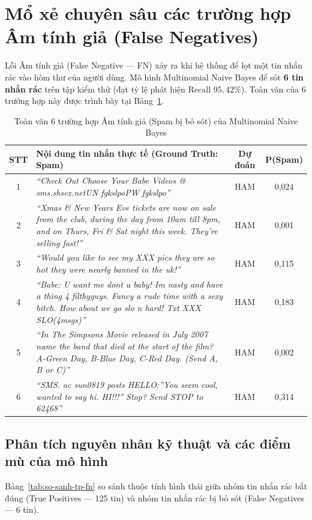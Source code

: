 \section{Mổ xẻ chuyên sâu các trường hợp Âm tính giả (False Negatives)}
\label{sec:false-negatives}

Lỗi Âm tính giả (False Negative --- FN) xảy ra khi hệ thống để lọt một tin nhắn rác vào hòm thư của người dùng. Mô hình Multinomial Naive Bayes để sót \textbf{6 tin nhắn rác} trên tập kiểm thử (đạt tỷ lệ phát hiện Recall $95,42\%$). Toàn văn của 6 trường hợp này được trình bày tại Bảng~\ref{tab:danh-sach-fn}.

\begin{table}[H]
\centering
\caption{Toàn văn 6 trường hợp Âm tính giả (Spam bị bỏ sót) của Multinomial Naive Bayes}
\label{tab:danh-sach-fn}
\begin{tabular}{|c|p{9.8cm}|c|c|}
\hline
\textbf{STT} & \textbf{Nội dung tin nhắn thực tế (Ground Truth: Spam)} & \textbf{Dự đoán} & \textbf{P(Spam)} \\
\hline
1 & \textit{“Check Out Choose Your Babe Videos @ sms.shsex.netUN fgkslpoPW fgkslpo”} & HAM & 0,024 \\
\hline
2 & \textit{“Xmas \& New Years Eve tickets are now on sale from the club, during the day from 10am till 8pm, and on Thurs, Fri \& Sat night this week. They're selling fast!”} & HAM & 0,001 \\
\hline
3 & \textit{“Would you like to see my XXX pics they are so hot they were nearly banned in the uk!”} & HAM & 0,115 \\
\hline
4 & \textit{“Babe: U want me dont u baby! Im nasty and have a thing 4 filthyguys. Fancy a rude time with a sexy bitch. How about we go slo n hard! Txt XXX SLO(4msgs)”} & HAM & 0,183 \\
\hline
5 & \textit{“In The Simpsons Movie released in July 2007 name the band that died at the start of the film? A-Green Day, B-Blue Day, C-Red Day. (Send A, B or C)”} & HAM & 0,002 \\
\hline
6 & \textit{“SMS. ac sun0819 posts HELLO:''You seem cool, wanted to say hi. HI!!!'' Stop? Send STOP to 62468”} & HAM & 0,314 \\
\hline
\end{tabular}
\end{table}

\subsection{Phân tích nguyên nhân kỹ thuật và các điểm mù của mô hình}
Bảng~\ref{tab:so-sanh-tp-fn} so sánh thuộc tính hình thái giữa nhóm tin nhắn rác bắt đúng (True Positives --- 125 tin) và nhóm tin nhắn rác bị bỏ sót (False Negatives --- 6 tin).

